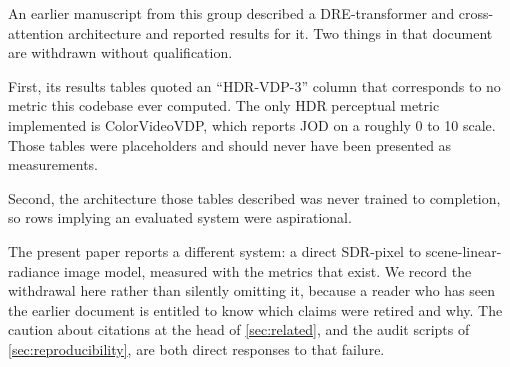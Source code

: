 An earlier manuscript from this group described a DRE-transformer and
cross-attention architecture and reported results for it. Two things in that
document are withdrawn without qualification.

First, its results tables quoted an ``HDR-VDP-3'' column that corresponds to no
metric this codebase ever computed. The only HDR perceptual metric implemented
is ColorVideoVDP, which reports JOD on a roughly 0 to 10 scale. Those tables
were placeholders and should never have been presented as measurements.

Second, the architecture those tables described was never trained to
completion, so rows implying an evaluated system were aspirational.

The present paper reports a different system: a direct SDR-pixel to
scene-linear-radiance image model, measured with the metrics that exist. We
record the withdrawal here rather than silently omitting it, because a reader
who has seen the earlier document is entitled to know which claims were retired
and why. The caution about citations at the head of \cref{sec:related}, and the
audit scripts of \cref{sec:reproducibility}, are both direct responses to that
failure.

